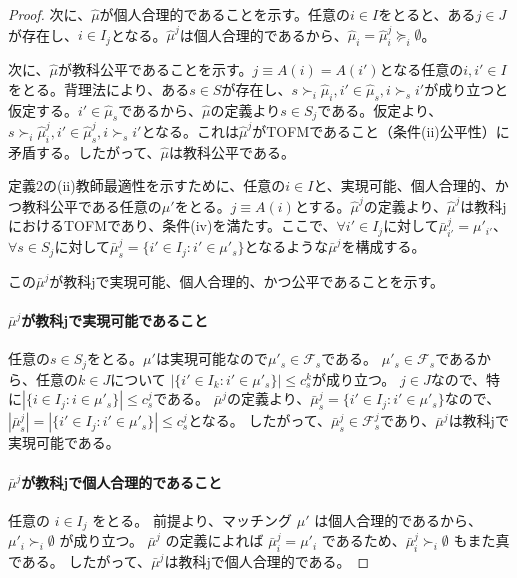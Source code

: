 \documentclass[12pt, a4paper]{article}
\theoremstyle{definition}
\theoremstyle{remark}
\theoremstyle{plain}
\begin{document}
\begin{proof}
次に、$\hat{\mu}$が個人合理的であることを示す。任意の$i \in I$をとると、ある$j \in J$が存在し、$i \in I_j$となる。$\hat{\mu}^j$は個人合理的であるから、$\hat{\mu}_i = \hat{\mu}^j_i \succeq_i \emptyset$。

次に、$\hat{\mu}$が教科公平であることを示す。$j \equiv A(i) = A(i')$となる任意の$i,i' \in I$をとる。背理法により、ある$s \in S$が存在し、$s \succ_i \hat{\mu}_i, i' \in \hat{\mu}_s, i \succ_s i'$が成り立つと仮定する。$i' \in \hat{\mu}_s$であるから、$\hat{\mu}$の定義より$s \in S_j$である。仮定より、$s \succ_i \hat{\mu}^j_i, i' \in \hat{\mu}^j_s, i \succ_s i'$となる。これは$\hat{\mu}^j$がTOFMであること（条件(ii)公平性）に矛盾する。したがって、$\hat{\mu}$は教科公平である。


定義2の(ii)教師最適性を示すために、任意の$i \in I$と、実現可能、個人合理的、かつ教科公平である任意の$\mu'$をとる。$j \equiv A(i)$とする。$\hat{\mu}^j$の定義より、$\hat{\mu}^j$は教科jにおけるTOFMであり、条件(iv)を満たす。ここで、$\forall i' \in I_j$に対して$\bar{\mu}^j_{i'} = \mu'_{i'}$、$\forall s \in S_j$に対して$\bar{\mu}^j_s = \{ i' \in I_j : i' \in \mu'_s\}$となるような$\bar{\mu}^j$を構成する。

この$\bar{\mu}^j$が教科jで実現可能、個人合理的、かつ公平であることを示す。

\paragraph{$\bar{\mu}^j$が教科jで実現可能であること}
任意の$s \in S_j$をとる。$\mu'$は実現可能なので$\mu'_s \in \mathcal{F}_s$である。
$\mu'_s \in \mathcal{F}_s$であるから、任意の$k \in J$について $|\{i' \in I_k : i' \in \mu'_s\}| \leq c^k_s$が成り立つ。
$j \in J$なので、特に$|\{i \in I_j : i \in \mu'_s\}| \leq c^j_s$である。
$\bar{\mu}^j$の定義より、$\bar{\mu}^j_s = \{ i' \in I_j : i' \in \mu'_s\}$なので、
$|\bar{\mu}^j_s| = |\{ i' \in I_j : i' \in \mu'_s\}| \leq c^j_s$となる。
したがって、$\bar{\mu}^j_s \in \mathcal{F}^j_s$であり、$\bar{\mu}^j$は教科jで実現可能である。

\paragraph{$\bar{\mu}^j$が教科jで個人合理的であること}
任意の $i \in I_j$ をとる。
前提より、マッチング $\mu'$ は個人合理的であるから、$\mu'_{i} \succ_{i} \emptyset$ が成り立つ。
$\bar{\mu}^j$ の定義によれば $\bar{\mu}^j_{i} = \mu'_{i}$ であるため、$\bar{\mu}^j_{i} \succ_{i} \emptyset$ もまた真である。
したがって、$\bar{\mu}^j$は教科jで個人合理的である。


\end{proof}
\end{document}
